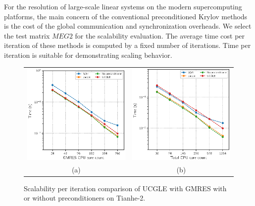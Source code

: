 For the resolution of large-scale linear systems on the modern supercomputing platforms, the main concern of the conventional preconditioned Krylov methods is the cost of the global communication and synchronization
overheads. We select the test matrix $MEG2$ for the scalability evaluation. The average time cost per iteration of these methods is computed by a fixed number of iterations. Time per iteration is suitable for demonstrating scaling behavior.

\begin{figure}[t]
	\centering
	\begin{tabular}{cc}
		\includegraphics[width=.48\linewidth]{fig/scalable.eps}
		&\includegraphics[width=.48\linewidth]{fig/scalable_complet.eps} \\[\abovecaptionskip]
		\small (a)& (b) 
	\end{tabular}
	\caption{Scalability per iteration comparison of UCGLE with GMRES with or without preconditioners on Tianhe-2.}\label{fig:myfig}
\end{figure}

